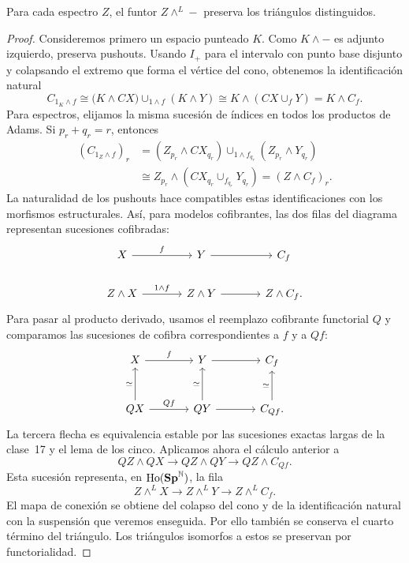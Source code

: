 \begin{prop}\label{prop:c18-smash-exacto}
Para cada espectro $Z$, el funtor $Z\wedge^L-$ preserva los triángulos distinguidos.
\end{prop}
\begin{proof}
Consideremos primero un espacio punteado $K$. Como $K\wedge-$ es adjunto izquierdo, preserva pushouts. Usando $I_+$ para el intervalo con punto base disjunto y colapsando el extremo que forma el vértice del cono, obtenemos la identificación natural
\[
C_{1_K\wedge f}\cong
\bigl(K\wedge CX\bigr)\cup_{1\wedge f}(K\wedge Y)
\cong K\wedge(CX\cup_fY)=K\wedge C_f.
\]
Para espectros, elijamos la misma sucesión de índices en todos los productos de Adams. Si $p_r+q_r=r$, entonces
\[
\begin{aligned}
(C_{1_Z\wedge f})_r
&=(Z_{p_r}\wedge CX_{q_r})\cup_{1\wedge f_{q_r}}
  (Z_{p_r}\wedge Y_{q_r})\\
&\cong Z_{p_r}\wedge(CX_{q_r}\cup_{f_{q_r}}Y_{q_r})
=(Z\wedge C_f)_r.
\end{aligned}
\]
La naturalidad de los pushouts hace compatibles estas identificaciones con los morfismos estructurales. Así, para modelos cofibrantes, las dos filas del diagrama representan sucesiones cofibradas:
\[
\begin{tikzcd}[column sep=large]
X\arrow[r,"f"]&Y\arrow[r]&C_f\\
Z\wedge X\arrow[r,"1\wedge f"]&Z\wedge Y\arrow[r]&Z\wedge C_f.
\end{tikzcd}
\]
Para pasar al producto derivado, usamos el reemplazo cofibrante functorial $Q$ y comparamos las sucesiones de cofibra correspondientes a $f$ y a $Qf$:
\[
\begin{tikzcd}[column sep=large,row sep=large]
X\arrow[r,"f"]&Y\arrow[r]&C_f\\
QX\arrow[r,"Qf"]\arrow[u,"\simeq"]&QY\arrow[r]\arrow[u,"\simeq"]&C_{Qf}\arrow[u,"\simeq"] .
\end{tikzcd}
\]
La tercera flecha es equivalencia estable por las sucesiones exactas largas de la clase~17 y el lema de los cinco. Aplicamos ahora el cálculo anterior a
\[
QZ\wedge QX\longrightarrow QZ\wedge QY\longrightarrow QZ\wedge C_{Qf}.
\]
Esta sucesión representa, en $\operatorname{Ho}(\mathbf{Sp}^{\mathbb N})$, la fila
\[
Z\wedge^L X\longrightarrow Z\wedge^L Y\longrightarrow Z\wedge^L C_f.
\]
El mapa de conexión se obtiene del colapso del cono y de la identificación natural con la suspensión que veremos enseguida. Por ello también se conserva el cuarto término del triángulo. Los triángulos isomorfos a estos se preservan por functorialidad.
\end{proof}

